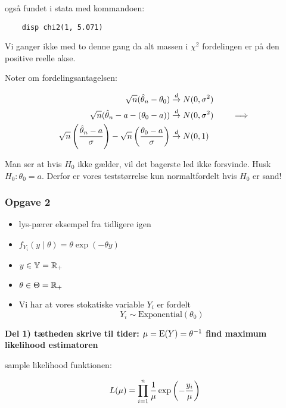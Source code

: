 også fundet i stata med kommandoen:

\begin{verbatim}
    disp chi2(1, 5.071)
\end{verbatim}

Vi ganger ikke med to denne gang da alt massen i $\chi^2$ fordelingen er på den positive reelle akse.

Noter om fordelingsantagelsen:

\begin{align}
    \sqrt{n}(\hat{\theta}_n -\theta_0) &\overset{d}{\rightarrow} N(0, \sigma^2) \\
    \sqrt{n}(\hat{\theta}_n - a - ( \theta_0- a)) &\overset{d}{\rightarrow} N(0, \sigma^2) \qquad \implies \\
    \sqrt{n} \left( \frac{\hat{\theta}_n - a}{\sigma} \right) - \sqrt{n}  \left( \frac{\theta_0 - a}{\sigma}\right) &\overset{d}{\rightarrow} N(0,1)
\end{align}

Man ser at hvis $H_0$ ikke gælder, vil det bagerste led ikke forsvinde. Husk $H_0 : \theta_0 = a$. Derfor er vores teststørrelse kun normaltfordelt hvis $H_0$ er sand!

\subsubsection{Opgave 2}

\begin{itemize}
    \item lys-pærer eksempel fra tidligere igen
    \item $f_{Y_i} (y \mid \theta) = \theta \exp(-\theta y)$
    \item $y \in \mathbb{Y} = \mathbb{R}_+$
    \item $\theta \in \Theta = \mathbb{R}_+$
    \item Vi har at vores stokatiske variable $Y_i$ er fordelt
    \begin{equation}
        Y_i \sim \text{Exponential}(\theta_0)
    \end{equation}
\end{itemize}

\textbf{Del 1) tætheden skrive til tider: $\mu = \text{E}(Y) = \theta^{-1}$ find maximum likelihood estimatoren}

sample likelihood funktionen:

\begin{equation}
    L ( \mu ) = \prod_{i=1}^{n} \frac{1}{\mu} \exp\left( - \frac{y_i}{\mu}\right)
\end{equation}


